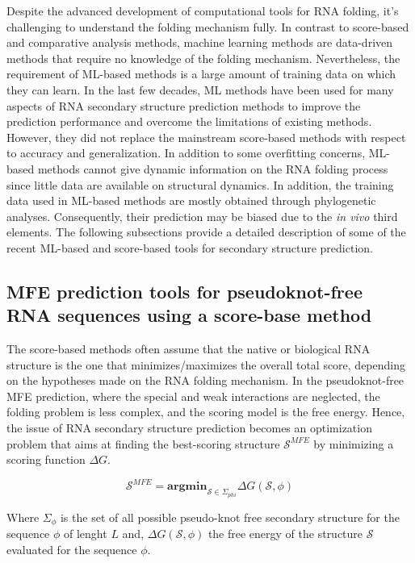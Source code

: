 Despite the advanced development of computational tools for RNA folding, it's challenging to understand the folding mechanism fully. In contrast to score-based and comparative analysis methods, machine learning methods are data-driven methods that require no knowledge of the folding mechanism. Nevertheless, the requirement of ML-based methods is a large amount of training data on which they can learn. In the last few decades, ML methods have been used for many aspects of RNA secondary structure prediction methods to improve the prediction performance and overcome the limitations of existing methods. However, they did not replace the mainstream score-based methods with respect to accuracy and generalization. In addition to some overfitting concerns, ML-based methods cannot give dynamic information on the RNA folding process since little data are available on structural dynamics. In addition, the training data used in ML-based methods are mostly obtained through phylogenetic analyses. Consequently, their prediction may be biased due to the \textit{in vivo} third elements. The following subsections provide a detailed description of some of the recent ML-based and score-based tools for secondary structure prediction.
\subsection{ MFE prediction tools for pseudoknot-free RNA sequences using a score-base method}
The score-based methods often assume that the native or biological RNA structure is the one that minimizes/maximizes the overall total score, depending on the hypotheses made on the RNA folding mechanism. In the pseudoknot-free MFE prediction, where the special and weak interactions are neglected, the folding problem is less complex, and the scoring model is the free energy. Hence, the issue of RNA secondary structure prediction becomes an optimization problem that aims at finding the best-scoring structure $\mathcal{S}^{MFE}$ by minimizing a scoring function $\Delta G$.

\begin{equation}
	\mathcal{S}^{MFE} =  \textbf{argmin}_{\mathcal{S} \in \Sigma_{phi}} \Delta G(\mathcal{S}, \phi) 
\end{equation}

Where $\Sigma_{\phi}$ is the set of all possible pseudo-knot free secondary structure for the sequence $\phi$ of lenght $L$ and, $\Delta G(\mathcal{S}, \phi)$ the free energy of the structure $\mathcal{S}$ evaluated for the sequence $\phi$.

